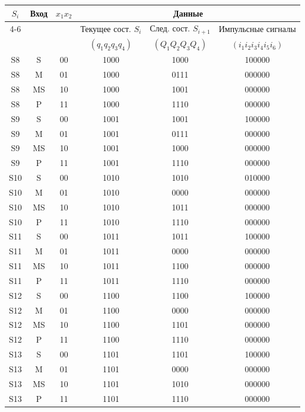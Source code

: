 \documentclass[11pt,a4paper,final]{article}
\begin{document}
			\scriptsize
	\begin{center}
		\begin{tabular}{|c|c|c||c|c|c|}
			\hline
			\multirow{2}{*}{\( S_i \)} & \multirow{2}{*}{Вход} & \multirow{2}{*}{\( x_1 x_2 \)} & \multicolumn{3}{c|}{Данные} \\
			\cline{4-6}
			& & & Текущее сост. \( S_i \) & След. сост. \( S_{i+1} \) & Импульсные сигналы \\
			& & & \( (q_1 q_2 q_3 q_4) \) & \( (Q_1 Q_2 Q_3 Q_4) \) & \( (i_1 i_2 i_3 i_4 i_5 i_6) \) \\
			\hline\hline
			S8 & S & 00 & 1000 & 1000 & 100000 \\
			S8 & M & 01 & 1000 & 0111 & 000000 \\
			S8 & MS & 10 & 1000 & 1001 & 000000 \\
			S8 & P & 11 & 1000 & 1110 & 000000 \\
			\hline
			S9 & S & 00 & 1001 & 1001 & 100000 \\
			S9 & M & 01 & 1001 & 0111 & 000000 \\
			S9 & MS & 10 & 1001 & 1000 & 000000 \\
			S9 & P & 11 & 1001 & 1110 & 000000 \\
			\hline
			S10 & S & 00 & 1010 & 1010 & 010000 \\
			S10 & M & 01 & 1010 & 0000 & 000000 \\
			S10 & MS & 10 & 1010 & 1011 & 000000 \\
			S10 & P & 11 & 1010 & 1110 & 000000 \\
			\hline
			S11 & S & 00 & 1011 & 1011 & 100000 \\
			S11 & M & 01 & 1011 & 0000 & 000000 \\
			S11 & MS & 10 & 1011 & 1100 & 000000 \\
			S11 & P & 11 & 1011 & 1110 & 000000 \\
			\hline
			S12 & S & 00 & 1100 & 1100 & 100000 \\
			S12 & M & 01 & 1100 & 0000 & 000000 \\
			S12 & MS & 10 & 1100 & 1101 & 000000 \\
			S12 & P & 11 & 1100 & 1110 & 000000 \\
			\hline
			S13 & S & 00 & 1101 & 1101 & 100000 \\
			S13 & M & 01 & 1101 & 0000 & 000000 \\
			S13 & MS & 10 & 1101 & 1010 & 000000 \\
			S13 & P & 11 & 1101 & 1110 & 000000 \\

\end{tabular}
\end{center}
\end{document}
